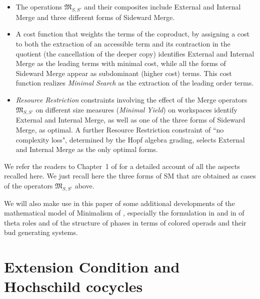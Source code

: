 \documentclass[12pt]{amsart}
\numberwithin{equation}{section}
\def\fM{{\mathfrak M}}
\def\fB{{\mathfrak B}}
\begin{document}
\begin{itemize}
the left-hand-side of the coproduct (and zero otherwise), $\fB$ is the grafting operator
from forests to trees $\fB(T\sqcup T')=\fM(T,T')$, and $\sqcup$ is the coproduct that
reassembles the new workspace at the end of this operation. These operators include
the case where $S$ or $S'$ can be the product unit $1$ (namely the formal empty forest),
as this case is needed in the case of Internal Merge.
\item The operations $\fM_{S,S'}$ and their composites include External and Internal
Merge and three different forms of Sideward Merge.
\item A cost function that weights the terms of the coproduct, by assigning a cost
to both the extraction of an accessible term and its contraction in the quotient (the
cancellation of the deeper copy) identifies External and Internal Merge as the leading
terms with minimal cost, while all the forms of Sideward Merge appear as subdominant
(higher cost) terms. This cost function realizes {\em Minimal Search} as the extraction of
the leading order terms.
\item {\em Resource Restriction} constraints involving the effect of the Merge operators
$\fM_{S,S'}$ on different size measures ({\em Minimal Yield}) on workspaces identify 
External and Internal Merge, as well as 
one of the three forms of Sideward Merge, as optimal. A further Resource Restriction
constraint of ``no complexity loss", determined by the Hopf algebra grading, selects
External and Internal Merge as the only optimal forms.
\end{itemize}

We refer the readers to Chapter~1 of \cite{MCB} for a detailed account of all the
aspects recalled here. We just recall here the three forms of SM that are obtained
as cases of the operators $\fM_{S,S'}$ above.

We will also make use in this paper of some additional developments of the
mathematical model of Minimalism of \cite{MCB}, especially the formulation
in \cite{MarLar} and in \cite{MHL} of theta roles and of the structure of phases
in terms of colored operads and their bud generating systems. 


\smallskip

\section{Extension Condition and Hochschild cocycles} \label{ECdualHsec}
\end{document}
